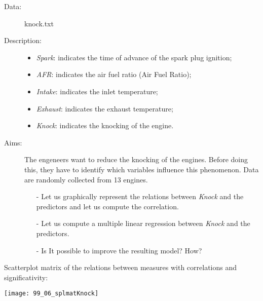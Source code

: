 

\begin{frame}
  \begin{description}
    \item[Data: ]knock.txt \\ 
    \item[Description: ]
      \begin{footnotesize}
        \begin{itemize}
          \item \textit{Spark}: indicates the time of advance of the spark plug ignition;
          \item \textit{AFR}: indicates the air fuel ratio (Air Fuel Ratio);
          \item \textit{Intake}: indicates the inlet temperature;
          \item \textit{Exhaust}: indicates the exhaust temperature;
          \item \textit{Knock}: indicates the knocking of the engine.
        \end{itemize}
      \end{footnotesize}
    \item[Aims: ]
      \begin{footnotesize}
        The engeneers want to reduce the knocking of the engines. Before doing this, they have to identify which variables influence this phenomenon. Data are randomly collected from 13 engines.
        \begin{itemize}
          \item[-] Let us graphically represent the relations between \textit{Knock} and the predictors and let us compute the correlation.
          \item[-] Let us compute a multiple linear regression between \textit{Knock} and the predictors.
          \item[-] Is It possible to improve the resulting model? How?
        \end{itemize}
      \end{footnotesize}
  \end{description}
\end{frame}

\begin{frame}
  Scatterplot matrix of the relations between measures with correlations and significativity: \\
  \vspace{-0.3cm}
  \begin{center}
    \texttt{[image: 99\_06\_splmatKnock]}
  \end{center}
\end{frame}

